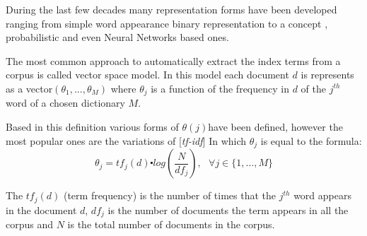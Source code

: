  During the last few decades many representation forms have been developed
 ranging from simple word appearance binary representation to a concept
 \cite{deerwester90indexing}, probabilistic and
 even Neural Networks \cite{DBLP:conf/icann/KellerB05} based ones. 
 \cite{keller-theme} \cite{361220}

The most common approach to automatically extract the index terms
from a corpus is called vector space model. In this
model each document $d$ is represents as a vector$(\theta_{1},...,\theta_{M})$
where $\theta_{j}$ is a function of the frequency in $d$ of the
$j^{th}$ word of a chosen dictionary $M$. 

Based in this definition various forms of $\theta(j)$have been defined,
however the most popular ones are the variations of [{\emph{tf-idf}}]  In
which $\theta_{j}$ is equal to the formula:
\begin{equation}
  \theta_{j}=tf_{j}(d)\centerdot log(\frac{N}{df_{j}}),\,\,\,\,\forall
  j\in\{1,\ldots,M\}\label{eq:tf-idf}
\end{equation}


 The $tf_{j}(d)$ (term frequency) is the number of times that the $j^{th}$ word appears
 in the document $d$, $df_{j}$ is the number of documents the term
 appears in all the corpus and $N$ is the total number of documents
 in the corpus. 


